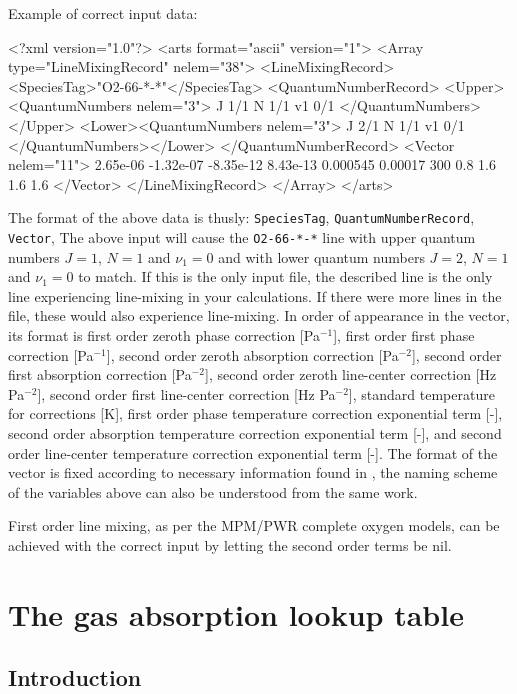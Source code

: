 Example of correct input data:
\begin{code}
<?xml version="1.0"?>
<arts format="ascii" version="1">
<Array type="LineMixingRecord" nelem="38">
<LineMixingRecord>
<SpeciesTag>"O2-66-*-*"</SpeciesTag>
<QuantumNumberRecord>
<Upper><QuantumNumbers nelem="3"> 
  J 1/1 N 1/1 v1 0/1 
</QuantumNumbers></Upper>
<Lower><QuantumNumbers nelem="3"> 
  J 2/1 N 1/1 v1 0/1 
</QuantumNumbers></Lower>
</QuantumNumberRecord>
<Vector nelem="11">
2.65e-06
-1.32e-07
-8.35e-12
8.43e-13
0.000545
0.00017
300
0.8
1.6
1.6
1.6
</Vector>
</LineMixingRecord>
</Array>
</arts>
\end{code}
The format of the above data is thusly: \verb|SpeciesTag|, \verb|QuantumNumberRecord|, \verb|Vector|, 
The above input will cause the \verb|O2-66-*-*| line with
upper quantum numbers $J=1$, $N=1$ and $\nu_1=0$ and with
lower quantum numbers $J=2$, $N=1$ and $\nu_1=0$ to match.
If this is the only input file, the described line is the only
line experiencing line-mixing in your calculations. If there
were more lines in the file, these would also experience line-mixing.
In order of appearance in the vector, its format is 
first order zeroth phase correction [Pa$^{-1}$], 
first order first phase correction [Pa$^{-1}$],
second order zeroth absorption correction [Pa$^{-2}$],
second order first absorption correction [Pa$^{-2}$],
second order zeroth line-center correction [Hz Pa$^{-2}$],
second order first line-center correction [Hz Pa$^{-2}$],
standard temperature for corrections [K],
first order phase temperature correction exponential term [-],
second order absorption temperature correction exponential term [-], and
second order line-center temperature correction exponential term [-].
The format of the vector is fixed according to necessary information found in \citet{makarov11:_60-ghz_jqsrt},
the naming scheme of the variables above can also be understood from the same work.

First order line mixing, as per the MPM/PWR complete oxygen models, 
can be achieved with the correct input by letting the second order terms be nil.

\section{The gas absorption lookup table}
\label{sec:absorption:lookup}

\subsection{Introduction}

